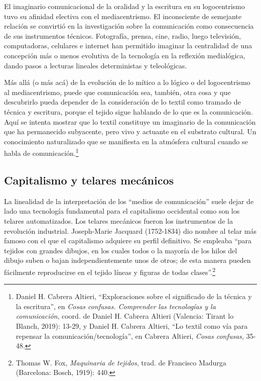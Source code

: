 \documentclass{tufte-handout}
\begin{document}
El imaginario comunicacional de la oralidad y la escritura en su
logocentrismo tuvo su afinidad electiva con el mediacentrismo. El
inconsciente de semejante relación se convirtió en la investigación
sobre la comunicación como consecuencia de sus instrumentos técnicos.
Fotografía, prensa, cine, radio, luego televisión, computadoras,
celulares e internet han permitido imaginar la centralidad de una
concepción más o menos evolutiva de la tecnología en la reflexión
medialógica, dando pasos a lecturas lineales deterministas y
teleológicas.

Más allá (o más acá) de la evolución de lo mítico a lo lógico o del
logocentrismo al mediacentrismo, puede que comunicación sea, también,
otra cosa y que descubrirlo pueda depender de la consideración de lo
textil como tramado de técnica y escritura, porque el tejido sigue
hablando de lo que es la comunicación. Aquí se intenta mostrar que lo
textil constituye un imaginario de la comunicación que ha permanecido
subyacente, pero vivo y actuante en el substrato cultural. Un
conocimiento naturalizado que se manifiesta en la atmósfera cultural
cuando se habla de comunicación.\footnote{Daniel H. Cabrera Altieri,
  ``Exploraciones sobre el significado de la técnica y la escritura'',
  en \emph{Cosas confusas. Comprender las tecnologías y la
  comunicación}, coord. de Daniel H. Cabrera Altieri (Valencia: Tirant
  lo Blanch, 2019): 13-29, y Daniel H. Cabrera Altieri, ``Lo textil como
  vía para repensar la comunicación/tecnología'', en Cabrera Altieri,
  \emph{Cosas confusas,} 35-48.}

\hypertarget{capitalismo-y-telares-mecnicos}{%
\subsection{Capitalismo y telares
mecánicos}\label{capitalismo-y-telares-mecnicos}}

La linealidad de la interpretación de los ``medios de comunicación''
suele dejar de lado una tecnología fundamental para el capitalismo
occidental como son los telares automatizados. Los telares mecánicos
fueron los instrumentos de la revolución industrial. Joseph-Marie
Jacquard (1752-1834) dio nombre al telar más famoso con el que el
capitalismo adquiere su perfil definitivo. Se empleaba ``para tejidos
con grandes dibujos, en los cuales todos o la mayoría de los hilos del
dibujo suben o bajan independientemente unos de otros; de esta manera
pueden fácilmente reproducirse en el tejido líneas y figuras de todas
clases''.\footnote{Thomas W. Fox, \emph{Maquinaria de tejidos}, trad. de
  Francisco Madurga (Barcelona: Bosch, 1919): 440.}
\end{document}
